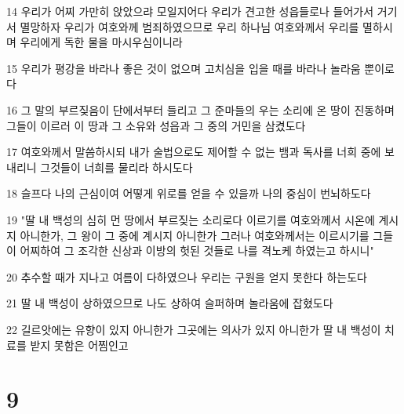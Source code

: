 \par 14 우리가 어찌 가만히 앉았으랴 모일지어다 우리가 견고한 성읍들로나 들어가서 거기서 멸망하자 우리가 여호와께 범죄하였으므로 우리 하나님 여호와께서 우리를 멸하시며 우리에게 독한 물을 마시우심이니라
\par 15 우리가 평강을 바라나 좋은 것이 없으며 고치심을 입을 때를 바라나 놀라움 뿐이로다
\par 16 그 말의 부르짖음이 단에서부터 들리고 그 준마들의 우는 소리에 온 땅이 진동하며 그들이 이르러 이 땅과 그 소유와 성읍과 그 중의 거민을 삼켰도다
\par 17 여호와께서 말씀하시되 내가 술법으로도 제어할 수 없는 뱀과 독사를 너희 중에 보내리니 그것들이 너희를 물리라 하시도다
\par 18 슬프다 나의 근심이여 어떻게 위로를 얻을 수 있을까 나의 중심이 번뇌하도다
\par 19 "딸 내 백성의 심히 먼 땅에서 부르짖는 소리로다 이르기를 여호와께서 시온에 계시지 아니한가, 그 왕이 그 중에 계시지 아니한가 그러나 여호와께서는 이르시기를 그들이 어찌하여 그 조각한 신상과 이방의 헛된 것들로 나를 격노케 하였는고 하시니"
\par 20 추수할 때가 지나고 여름이 다하였으나 우리는 구원을 얻지 못한다 하는도다
\par 21 딸 내 백성이 상하였으므로 나도 상하여 슬퍼하며 놀라움에 잡혔도다
\par 22 길르앗에는 유향이 있지 아니한가 그곳에는 의사가 있지 아니한가 딸 내 백성이 치료를 받지 못함은 어찜인고

\chapter{9}

